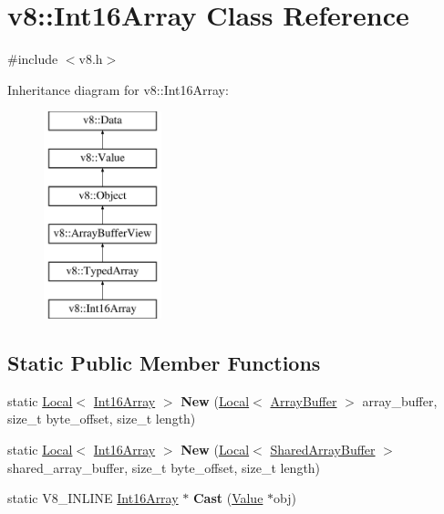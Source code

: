 \hypertarget{classv8_1_1Int16Array}{}\section{v8\+:\+:Int16\+Array Class Reference}
\label{classv8_1_1Int16Array}


{\ttfamily \#include $<$v8.\+h$>$}

Inheritance diagram for v8\+:\+:Int16\+Array\+:\begin{figure}[H]
\begin{center}
\leavevmode
\includegraphics[height=6.000000cm]{classv8_1_1Int16Array}
\end{center}
\end{figure}
\subsection*{Static Public Member Functions}
\begin{DoxyCompactItemize}
\item 
static \hyperlink{classv8_1_1Local}{Local}$<$ \hyperlink{classv8_1_1Int16Array}{Int16\+Array} $>$ {\bfseries New} (\hyperlink{classv8_1_1Local}{Local}$<$ \hyperlink{classv8_1_1ArrayBuffer}{Array\+Buffer} $>$ array\+\_\+buffer, size\+\_\+t byte\+\_\+offset, size\+\_\+t length)\hypertarget{classv8_1_1Int16Array_a6e102d644c3f96345bcf212673b96090}{}\label{classv8_1_1Int16Array_a6e102d644c3f96345bcf212673b96090}

\item 
static \hyperlink{classv8_1_1Local}{Local}$<$ \hyperlink{classv8_1_1Int16Array}{Int16\+Array} $>$ {\bfseries New} (\hyperlink{classv8_1_1Local}{Local}$<$ \hyperlink{classv8_1_1SharedArrayBuffer}{Shared\+Array\+Buffer} $>$ shared\+\_\+array\+\_\+buffer, size\+\_\+t byte\+\_\+offset, size\+\_\+t length)\hypertarget{classv8_1_1Int16Array_a9634021f52042c976091549358731432}{}\label{classv8_1_1Int16Array_a9634021f52042c976091549358731432}

\item 
static V8\+\_\+\+I\+N\+L\+I\+NE \hyperlink{classv8_1_1Int16Array}{Int16\+Array} $\ast$ {\bfseries Cast} (\hyperlink{classv8_1_1Value}{Value} $\ast$obj)\hypertarget{classv8_1_1Int16Array_abef12f11ace9c74a4ce451db28b954e5}{}\label{classv8_1_1Int16Array_abef12f11ace9c74a4ce451db28b954e5}

\end{DoxyCompactItemize}
